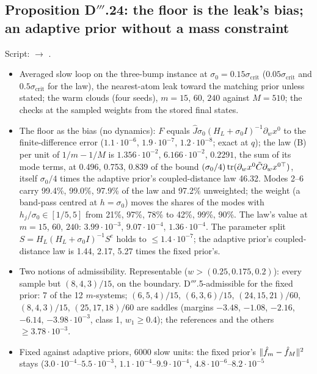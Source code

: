\subsection{Proposition D\texorpdfstring{$'''$}{'''}.24: the floor is the leak's bias; an adaptive prior without a
mass constraint}

Script:  $\to$ .
\begin{itemize}
  \item Averaged slow loop on the three-bump instance at $\sigma_0=0.15\sigma_{\mathrm{crit}}$
    ($0.05\sigma_{\mathrm{crit}}$ and $0.5\sigma_{\mathrm{crit}}$ for the law), the nearest-atom leak toward the
    matching prior unless stated; the warm clouds (four seeds), $m=15$, $60$, $240$ against $M=510$; the checks at the
    sampled weights from the stored final states.
  \item The floor as the bias (no dynamics): $F$ equals $\hat J\sigma_0(H_L+\sigma_0I)^{-1}\partial_wx^0$ to the
    finite-difference error ($1.1\cdot10^{-6}$, $1.9\cdot10^{-7}$, $1.2\cdot10^{-8}$; exact at $q$); the law (B) per
    unit of $1/m-1/M$ is $1.356\cdot10^{-2}$, $6.166\cdot10^{-2}$, $0.2291$, the sum of its mode terms, at 0.496,
    0.753, 0.839 of the bound $(\sigma_0/4)\operatorname{tr}(\partial_wx^0\tilde C\partial_wx^{0\top})$, itself $\sigma_0/4$ times the
    adaptive prior's coupled-distance law 46.32. Modes 2--6 carry 99.4\%, 99.0\%, 97.9\% of the law and 97.2\%
    unweighted; the weight (a band-pass centred at $h=\sigma_0$) moves the shares of the modes with
    $h_j/\sigma_0\in[1/5,5]$ from 21\%, 97\%, 78\% to 42\%, 99\%, 90\%. The law's value at $m=15$, $60$, $240$:
    $3.99\cdot10^{-3}$, $9.07\cdot10^{-4}$, $1.36\cdot10^{-4}$. The parameter split
    $S=H_L(H_L+\sigma_0I)^{-1}S^e$ holds to $\le1.4\cdot10^{-7}$; the adaptive prior's coupled-distance law is 1.44,
    2.17, 5.27 times the fixed prior's.
  \item Two notions of admissibility. Representable ($w>(0.25,0.175,0.2)$): every sample but $(8,4,3)/15$, on the
    boundary. D$'''$.5-admissible for the fixed prior: 7 of the 12 $m$-systems; $(6,5,4)/15$, $(6,3,6)/15$,
    $(24,15,21)/60$, $(8,4,3)/15$, $(25,17,18)/60$ are saddles (margins $-3.48$, $-1.08$, $-2.16$, $-6.14$,
    $-3.98\cdot10^{-3}$, class 1, $w_1\ge0.4$); the references and the others $\ge3.78\cdot10^{-3}$.
  \item Fixed against adaptive priors, 6000 slow units: the fixed prior's $\lVert \hat f_m-\hat f_M\rVert^2$ stays
    ($3.0\cdot10^{-4}$--$5.5\cdot10^{-3}$, $1.1\cdot10^{-4}$--$9.9\cdot10^{-4}$, $4.8\cdot10^{-6}$--$8.2\cdot10^{-5}$

\end{itemize}
